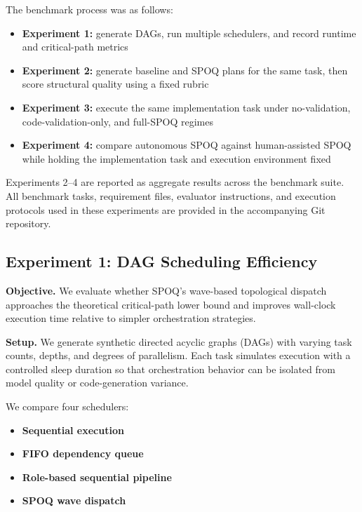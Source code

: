 The benchmark process was as follows:

\begin{itemize}
    \item \textbf{Experiment 1:} generate DAGs, run multiple schedulers, and record runtime and critical-path metrics
    \item \textbf{Experiment 2:} generate baseline and SPOQ plans for the same task, then score structural quality using a fixed rubric
    \item \textbf{Experiment 3:} execute the same implementation task under no-validation, code-validation-only, and full-SPOQ regimes
    \item \textbf{Experiment 4:} compare autonomous SPOQ against human-assisted SPOQ while holding the implementation task and execution environment fixed
\end{itemize}

Experiments 2--4 are reported as aggregate results across the benchmark suite. All benchmark tasks, requirement files, evaluator instructions, and execution protocols used in these experiments are provided in the accompanying Git repository.

\subsection{Experiment 1: DAG Scheduling Efficiency}

\textbf{Objective.}
We evaluate whether SPOQ's wave-based topological dispatch approaches the theoretical critical-path lower bound and improves wall-clock execution time relative to simpler orchestration strategies.

\textbf{Setup.}
We generate synthetic directed acyclic graphs (DAGs) with varying task counts, depths, and degrees of parallelism. Each task simulates execution with a controlled sleep duration so that orchestration behavior can be isolated from model quality or code-generation variance.

We compare four schedulers:

\begin{itemize}
    \item \textbf{Sequential execution}
    \item \textbf{FIFO dependency queue}
    \item \textbf{Role-based sequential pipeline}
    \item \textbf{SPOQ wave dispatch}
\end{itemize}

